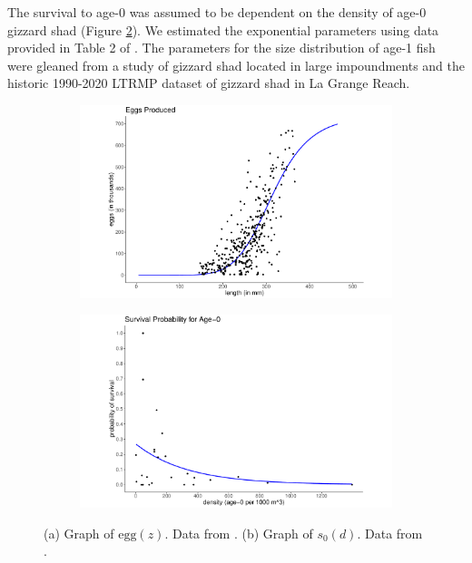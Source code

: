 \documentclass[preprint,review,12pt,authoryear]{elsarticle}
\begin{document}
The survival to age-0 was assumed to be dependent on the density of age-0 gizzard shad (Figure \ref{fig:surv_age0}).  
We estimated the exponential parameters using data provided in Table 2 of \citep{michaletz2010overwinter}. 
The parameters for the size distribution of age-1 fish were gleaned from a study of gizzard shad located in large impoundments \citep{michaletz2017variation} and the historic 1990-2020 LTRMP dataset of gizzard shad in La Grange Reach.


\begin{figure}
\centering
\begin{subfigure}[b]{.43\textwidth}
  \includegraphics[width=\textwidth]{figures/Figure1a.pdf}
  \caption{}
  \label{fig:eggs}
\end{subfigure}
\begin{subfigure}[b]{.43\textwidth}
  \includegraphics[width=\textwidth]{figures/Figure1b.pdf}
  \caption{}
  \label{fig:surv_age0}
\end{subfigure}
\caption{(a) Graph of $\mbox{egg}(z)$. Data from \citep{jons1997ovarian}.  (b) Graph of $s_0(d)$. Data from \citep{michaletz2010overwinter}. }
\label{fig:fecundity}
\end{figure}    
%
\end{document}

